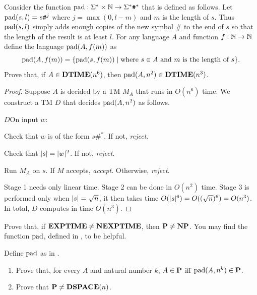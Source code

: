   \begin{problem}
    Consider the function $\text{pad} : \Sigma^\ast \times \mathbb N \to \Sigma^\ast\texttt{\#}^\ast$ that is defined as follows. Let $\text{pad}(s, l) = s\texttt{\#}^j$ where $j = \max(0, l - m)$ and $m$ is the length of $s$. Thus $\text{pad}(s, l)$ simply adds enough copies of the new symbol $\texttt{\#}$ to the end of $s$ so that the length of the result is at least $l$. For any language $A$ and function $f : \mathbb N \to \mathbb N$ define the language $\text{pad}(A, f(m))$ as
    \[ \text{pad}(A, f(m)) = \{ \text{pad}(s, f(m)) \mid \text{where $s \in A$ and $m$ is the length of $s$} \}. \]
    Prove that, if $A \in \textbf{DTIME}(n^6)$, then $\text{pad}(A, n^2) \in \textbf{DTIME}(n^3)$.

    \begin{sol}
      \begin{proof}
        Suppose $A$ is decided by a TM $M_A$ that runs in $O(n^6)$ time. We construct a TM $D$ that decides $\text{pad}(A, n^2)$ as follows.
        \begin{turing}{$D$}{On input $w$:}
        \item Check that $w$ is of the form $s\texttt{\#}^\ast$. If not, \emph{reject}.
        \item Check that $| s | = | w |^2$. If not, \emph{reject}.
        \item Run $M_A$ on $s$. If $M$ accepts, \emph{accept}. Otherwise, \emph{reject}.
        \end{turing}
        Stage 1 needs only linear time. Stage 2 can be done in $O(n^2)$ time. Stage 3 is performed only when $| s | = \sqrt{n}$, it then takes time $O(| s |^6) = O((\sqrt{n})^6) = O(n^3)$. In total, $D$ computes in time $O(n^3)$.
      \end{proof}
    \end{sol}
  \end{problem}

  \begin{problem}
    Prove that, if $\textbf{EXPTIME} \neq \textbf{NEXPTIME}$, then $\textbf{P} \neq \textbf{NP}$. You may find the function $\text{pad}$, defined in , to be helpful.
  \end{problem}

  \begin{problem}
    Define $\text{pad}$ as in .
    \begin{enumerate}
      \item Prove that, for every $A$ and natural number $k$, $A \in \textbf{P}$ iff $\text{pad}(A, n^k) \in \textbf{P}$.
      \item Prove that $\textbf{P} \neq \textbf{DSPACE}(n)$.
    \end{enumerate}
  \end{problem}

